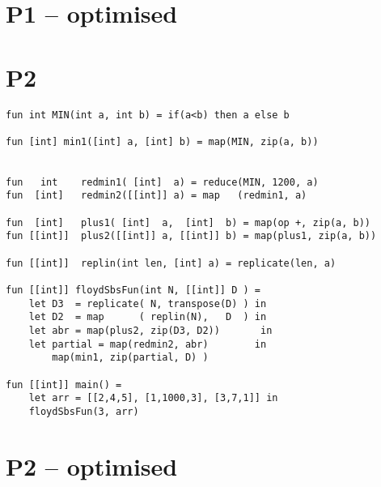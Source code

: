 \section{P1 -- optimised}



\section{P2}
\begin{verbatim}
fun int MIN(int a, int b) = if(a<b) then a else b

fun [int] min1([int] a, [int] b) = map(MIN, zip(a, b))


fun   int    redmin1( [int]  a) = reduce(MIN, 1200, a)
fun  [int]   redmin2([[int]] a) = map   (redmin1, a)

fun  [int]   plus1( [int]  a,  [int]  b) = map(op +, zip(a, b))
fun [[int]]  plus2([[int]] a, [[int]] b) = map(plus1, zip(a, b))

fun [[int]]  replin(int len, [int] a) = replicate(len, a)

fun [[int]] floydSbsFun(int N, [[int]] D ) =
    let D3  = replicate( N, transpose(D) ) in
    let D2  = map      ( replin(N),   D  ) in
    let abr = map(plus2, zip(D3, D2))       in
    let partial = map(redmin2, abr)        in
        map(min1, zip(partial, D) )

fun [[int]] main() =
    let arr = [[2,4,5], [1,1000,3], [3,7,1]] in
    floydSbsFun(3, arr)
\end{verbatim}

\section{P2 -- optimised}




